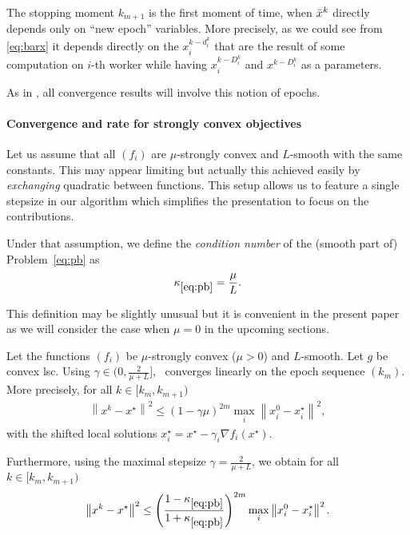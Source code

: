 The stopping moment $k_{m+1}$ is the first moment of time, when $\bar{x}^k$ directly depends only on ``new epoch'' variables. More precisely, as we could see from \eqref{eq:barx} it depends directly on the $x_i^{k-d_i^k}$ that are the result of some computation on $i$-th worker while having $x_i^{k-D_i^k}$ and $x^{k-D_i^k}$ as a parameters.

As in \cite{mishchenko2019distributed}, all convergence results will involve this notion of epochs.


\paragraph{Convergence and rate for strongly convex objectives}

Let us assume that all $(f_i)$ are $\mu$-strongly convex and $L$-smooth with the same constants. This may appear limiting but actually this achieved easily by \emph{exchanging} quadratic between functions. This setup allows us to feature a single stepsize in our algorithm which simplifies the presentation to focus on the contributions.

Under that assumption, we define the \emph{condition number} of the (smooth part of) Problem~\eqref{eq:pb} as 
$$\kappa_{\eqref{eq:pb}} = \frac{\mu}{L}.$$

This definition may be slightly unusual but it is convenient in the present paper as we will consider the case when $\mu=0$ in the upcoming sections. 


\begin{theorem} \label{th:davepg}
Let the functions $(f_i)$ be $\mu$-strongly convex ($\mu>0$) and $L$-smooth. Let $g$ be convex lsc. Using $\gamma \in (0, \frac{2}{\mu + L}]$, \dave~converges linearly on the epoch sequence $(k_m)$. More precisely, for all $k\in [k_m, k_{m+1})$
\begin{align*}
    \left\| x^k - x^\star \right\|^2 \le \left(1 - \gamma \mu  \right)^{2m} \max_i\left\|x_i^0-x_i^\star\right\|^2,
\end{align*}
with the shifted local solutions $x_i^\star = x^\star - \gamma_i\nabla f_i(x^\star)$. 

Furthermore, using the maximal stepsize $\gamma = \frac{2}{\mu + L}$, we obtain for all $k\in [k_m, k_{m+1})$
\begin{align*}
    \left\| x^k - x^\star \right\|^2 \le \left( \frac{1-\kappa_{\eqref{eq:pb}}}{1+\kappa_{\eqref{eq:pb}}}  \right)^{2m} \max_i\left\|x_i^0-x_i^\star\right\|^2.
\end{align*}
\end{theorem}


